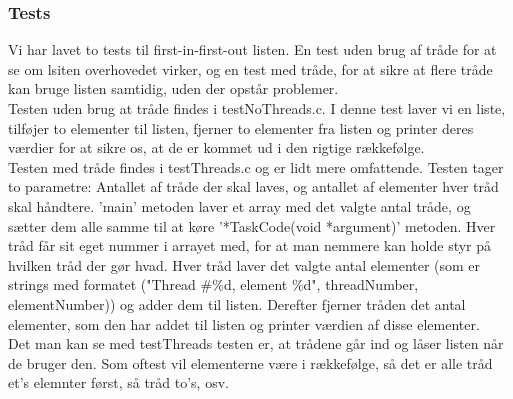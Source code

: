 \subsubsection{Tests}
\label{O2_Tests}
Vi har lavet to tests til first-in-first-out listen. En test uden brug af tråde for at se om lsiten overhovedet virker, og en test med tråde, for at sikre at flere tråde kan bruge listen samtidig, uden der opstår problemer.
\\Testen uden brug at tråde findes i testNoThreads.c. I denne test laver vi en liste, tilføjer to elementer til listen, fjerner to elementer fra listen og printer deres værdier for at sikre os, at de er kommet ud i den rigtige rækkefølge. 
\\Testen med tråde findes i testThreads.c og er lidt mere omfattende. Testen tager to parametre: Antallet af tråde der skal laves, og antallet af elementer hver tråd skal håndtere. 'main' metoden laver et array med det valgte antal tråde, og sætter dem alle samme til at køre '*TaskCode(void *argument)' metoden. Hver tråd får sit eget nummer i arrayet med, for at man nemmere kan holde styr på hvilken tråd der gør hvad. Hver tråd laver det valgte antal elementer (som er strings med formatet ("Thread \#\%d, element \%d", threadNumber, elementNumber)) og adder dem til listen. Derefter fjerner tråden det antal elementer, som den har addet til listen og printer værdien af disse elementer. 
\\Det man kan se med testThreads testen er, at trådene går ind og låser listen når de bruger den. Som oftest vil elementerne være i rækkefølge, så det er alle tråd et's elemnter først, så tråd to's, osv.

